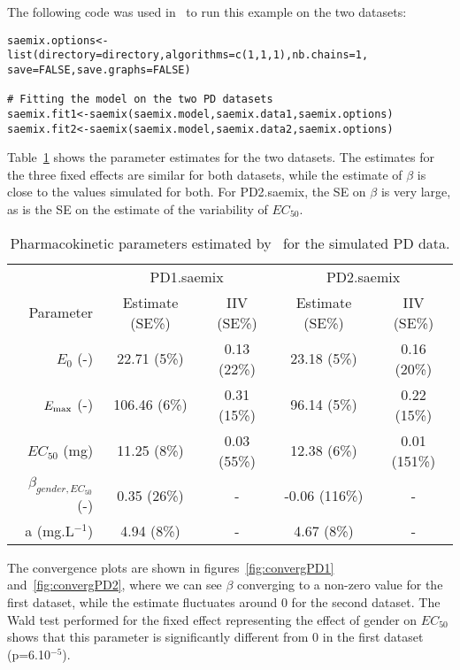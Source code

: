 {The following code was used in \R~to run this example on the two datasets:
\begin{verbatim}
saemix.options<-list(directory=directory,algorithms=c(1,1,1),nb.chains=1, 
save=FALSE,save.graphs=FALSE)

# Fitting the model on the two PD datasets
saemix.fit1<-saemix(saemix.model,saemix.data1,saemix.options)
saemix.fit2<-saemix(saemix.model,saemix.data2,saemix.options)
\end{verbatim}

Table~\ref{tab:paramPD} shows the parameter estimates for the two datasets. The estimates for the three fixed effects are similar for both datasets, while the estimate of $\beta$ is close to the values simulated for both. For {\sf PD2.saemix}, the SE on $\beta$ is very large, as is the SE on the estimate of the variability of $EC_{50}$.
\begin{table}[!h]
\begin{center}
\begin{tabular}{r c c c c}
\hline
& \multicolumn{2}{c}{PD1.saemix} &\multicolumn{2}{c}{PD2.saemix} \\
Parameter & Estimate (SE\%) & IIV (SE\%)  & Estimate (SE\%) & IIV (SE\%)\\
\hline
$E_{0}$ (-) & 22.71 (5\%) & 0.13 (22\%) & 23.18 (5\%) & 0.16 (20\%)\\
$E_{\rm max}$ (-) & 106.46 (6\%) & 0.31 (15\%) & 96.14 (5\%) & 0.22 (15\%) \\ 
$EC_{50}$ (mg) & 11.25 (8\%) & 0.03 (55\%) & 12.38 (6\%) & 0.01 (151\%)\\
$\beta_{gender,EC_{50}}$ (-) & 0.35 (26\%) & - & -0.06 (116\%) & - \\
a (mg.L$^{-1}$) & 4.94 (8\%) & - & 4.67 (8\%) & - \\
\hline
\end{tabular} 
\caption{Pharmacokinetic parameters estimated by \saemix~for the simulated PD data.} \label{tab:paramPD}
\end{center}
\end{table}

The convergence plots are shown in figures~\ref{fig:convergPD1} and~\ref{fig:convergPD2}, where we can see $\beta$ converging to a non-zero value for the first dataset, while the estimate fluctuates around 0 for the second dataset. The Wald test performed for the fixed effect representing the effect of gender on $EC_{50}$ shows that this parameter is significantly different from 0 in the first dataset (p=6.10$^{-5}$).

}
